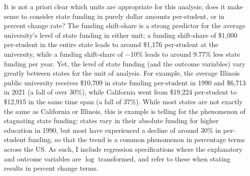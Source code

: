 It is not a priori clear which units are appropriate for this analysis;
does it make sense to consider state funding in purely dollar amounts per-student, or in percent change rate?
The funding shift-share is a strong predictor for the average university's level of state funding in either unit; a funding shift-share of \$1,000 per-student in the entire state leads to around \$1,176 per-student at the university, while a funding shift-share of $-10$\% leads to around 9.77\% less state funding per year.
Yet, the level of state funding (and the outcome variables) vary greatly between states for the unit of analysis.
For example, the average Illinois public university receives \$10,709 in state funding per-student in 1990 and  \$6,713 in 2021 (a fall of over 30\%), while California went from \$19,224 per-student to \$12,915 in the same time span (a fall of 37\%).
While most states are not exactly the same as California or Illinois, this is example is telling for the phenomenon of stagnating state funding:
states vary in their absolute funding for higher education in 1990, but most have experienced a decline of around 30\% in per-student funding, so that the trend is a common phenomenon in percentage terms across the US.
As such, I include regression specifications where the explanatory and outcome variables are $\log$ transformed, and refer to these when stating results in percent change terms.

